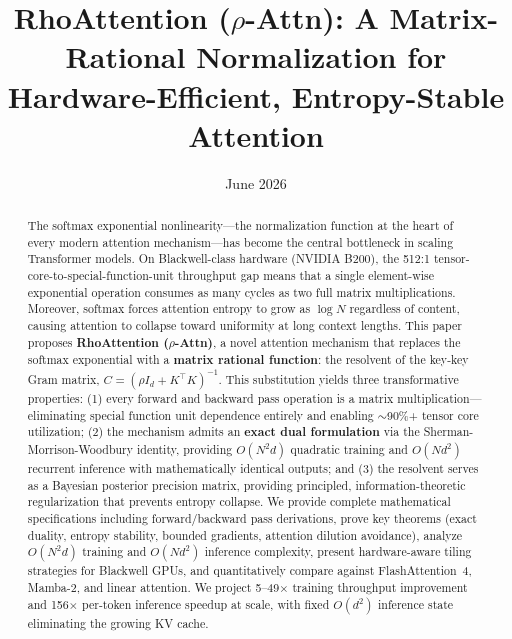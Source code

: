 \documentclass[11pt,a4paper]{article}
\title{\textbf{RhoAttention ($\rho$-Attn): A Matrix-Rational Normalization for\\Hardware-Efficient, Entropy-Stable Attention}}
\author{}
\date{June 2026}
\theoremstyle{remark}
\begin{document}
\maketitle

\begin{abstract}
The softmax exponential nonlinearity---the normalization function at the heart of every modern attention mechanism---has become the central bottleneck in scaling Transformer models. On Blackwell-class hardware (NVIDIA B200), the 512:1 tensor-core-to-special-function-unit throughput gap means that a single element-wise exponential operation consumes as many cycles as two full matrix multiplications. Moreover, softmax forces attention entropy to grow as $\log N$ regardless of content, causing attention to collapse toward uniformity at long context lengths. This paper proposes \textbf{RhoAttention ($\rho$-Attn)}, a novel attention mechanism that replaces the softmax exponential with a \textbf{matrix rational function}: the resolvent of the key-key Gram matrix, $C = (\rho I_d + K^\top K)^{-1}$. This substitution yields three transformative properties: (1) every forward and backward pass operation is a matrix multiplication---eliminating special function unit dependence entirely and enabling $\sim$90\%+ tensor core utilization; (2) the mechanism admits an \textbf{exact dual formulation} via the Sherman-Morrison-Woodbury identity, providing $O(N^2 d)$ quadratic training and $O(N d^2)$ recurrent inference with mathematically identical outputs; and (3) the resolvent serves as a Bayesian posterior precision matrix, providing principled, information-theoretic regularization that prevents entropy collapse. We provide complete mathematical specifications including forward/backward pass derivations, prove key theorems (exact duality, entropy stability, bounded gradients, attention dilution avoidance), analyze $O(N^2d)$ training and $O(Nd^2)$ inference complexity, present hardware-aware tiling strategies for Blackwell GPUs, and quantitatively compare against FlashAttention~4, Mamba-2, and linear attention. We project 5--49$\times$ training throughput improvement and 156$\times$ per-token inference speedup at scale, with fixed $O(d^2)$ inference state eliminating the growing KV cache.
\end{abstract}

\end{document}
